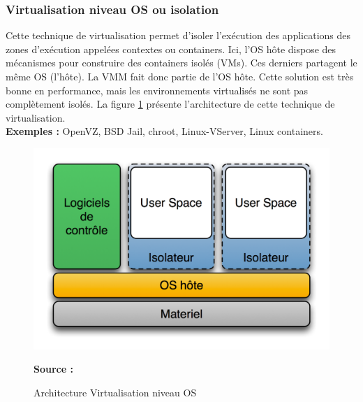     \subsubsection{Virtualisation niveau OS ou isolation}
    Cette technique de virtualisation permet d'isoler l'exécution des applications des zones d'exécution appelées contextes ou containers. Ici, l'\acs{OS} hôte dispose des mécanismes pour construire des containers isolés (VMs). Ces derniers partagent le même OS (l'hôte). La \acs{VMM} fait donc partie de l'OS hôte. Cette solution est très bonne en performance, mais les environnements virtualisés ne sont pas complètement isolés. La figure \ref{fig:virtualisation_niveau_os} présente l'architecture de cette technique de virtualisation.
    \\ \textbf{Exemples :} OpenVZ,  BSD Jail, chroot, Linux-VServer, Linux containers.
    \begin{figure}[htp]
      \centering
      \includegraphics[scale=.8]{fig1/virtualisation_niveau_os.png}
      \caption{Architecture Virtualisation niveau OS}
      \label{fig:virtualisation_niveau_os}
      \centering \bfseries Source : \cite{online2}
    \end{figure}
    
